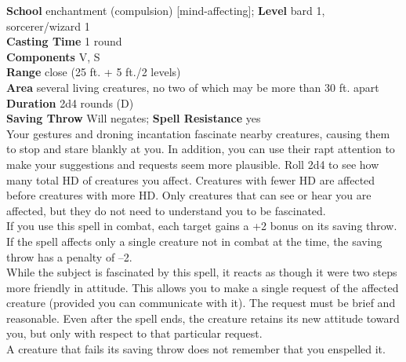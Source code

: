 \textbf{School} enchantment (compulsion) [mind-affecting]; \textbf{Level} bard 1, sorcerer/wizard 1\\
\textbf{Casting Time} 1 round\\
\textbf{Components} V, S\\
\textbf{Range} close (25 ft. + 5 ft./2 levels)\\
\textbf{Area} several living creatures, no two of which may be more than 30 ft. apart\\
\textbf{Duration} 2d4 rounds (D)\\
\textbf{Saving Throw }Will negates; \textbf{Spell Resistance} yes\\
Your gestures and droning incantation fascinate nearby creatures, causing them to stop and stare blankly at you. In addition, you can use their rapt attention to make your suggestions and requests seem more plausible. Roll 2d4 to see how many total HD of creatures you affect. Creatures with fewer HD are affected before creatures with more HD. Only creatures that can see or hear you are affected, but they do not need to understand you to be fascinated.\\
If you use this spell in combat, each target gains a +2 bonus on its saving throw. If the spell affects only a single creature not in combat at the time, the saving throw has a penalty of --2.\\
While the subject is fascinated by this spell, it reacts as though it were two steps more friendly in attitude. This allows you to make a single request of the affected creature (provided you can communicate with it). The request must be brief and reasonable. Even after the spell ends, the creature retains its new attitude toward you, but only with respect to that particular request.\\
A creature that fails its saving throw does not remember that you enspelled it.\\
